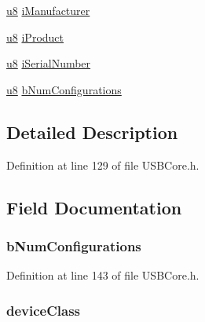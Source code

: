 \begin{DoxyCompactItemize}
\item 
\hyperlink{_u_s_b_a_p_i_8h_aed742c436da53c1080638ce6ef7d13de}{u8} \hyperlink{struct_device_descriptor_aae88465cfdcbe8c3654a5d317ca2a428}{i\+Manufacturer}
\item 
\hyperlink{_u_s_b_a_p_i_8h_aed742c436da53c1080638ce6ef7d13de}{u8} \hyperlink{struct_device_descriptor_a038aa24fddd7b42b20976e13392954f2}{i\+Product}
\item 
\hyperlink{_u_s_b_a_p_i_8h_aed742c436da53c1080638ce6ef7d13de}{u8} \hyperlink{struct_device_descriptor_ad5cf25949929f3baddc6f1b2751835dc}{i\+Serial\+Number}
\item 
\hyperlink{_u_s_b_a_p_i_8h_aed742c436da53c1080638ce6ef7d13de}{u8} \hyperlink{struct_device_descriptor_a26db168b352c51f781975b270ee76692}{b\+Num\+Configurations}
\end{DoxyCompactItemize}


\subsection{Detailed Description}


Definition at line 129 of file U\+S\+B\+Core.\+h.



\subsection{Field Documentation}
\hypertarget{struct_device_descriptor_a26db168b352c51f781975b270ee76692}{}
\subsubsection[{b\+Num\+Configurations}]{ b\+Num\+Configurations}\label{struct_device_descriptor_a26db168b352c51f781975b270ee76692}


Definition at line 143 of file U\+S\+B\+Core.\+h.

\hypertarget{struct_device_descriptor_ac951c25b0d755d42cb5f4a13692d511c}{}
\subsubsection[{device\+Class}]{ device\+Class}\label{struct_device_descriptor_ac951c25b0d755d42cb5f4a13692d511c}


